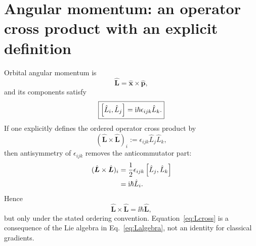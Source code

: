 \section{Angular momentum: an operator cross product with an explicit definition}

Orbital angular momentum is
\begin{equation}
\hat{\bm{L}}=\hat{\bm{x}}\times\hat{\bm{p}},
\end{equation}
and its components satisfy
\begin{equation}
\boxed{
\left[\hat L_i,\hat L_j\right]
=
\mathrm{i}\hbar\epsilon_{ijk}\hat L_k.
}
\label{eq:Lalgebra}
\end{equation}
If one explicitly defines the ordered operator cross product by
\begin{equation}
(\hat{\bm{L}}\times\hat{\bm{L}})_i
:=
\epsilon_{ijk}\hat L_j\hat L_k,
\end{equation}
then antisymmetry of \(\epsilon_{ijk}\) removes the anticommutator part:
\begin{align}
(\hat{\bm{L}}\times\hat{\bm{L}})_i
&=
\frac{1}{2}\epsilon_{ijk}\left[\hat L_j,\hat L_k\right]
\\
&=
\mathrm{i}\hbar\hat L_i.
\end{align}
Hence
\begin{equation}
\boxed{
\hat{\bm{L}}\times\hat{\bm{L}}
=
\ii\hbar\hat{\bm{L}},
}
\label{eq:Lcross}
\end{equation}
but only under the stated ordering convention. Equation~\eqref{eq:Lcross} is a consequence of the Lie algebra in Eq.~\eqref{eq:Lalgebra}, not an identity for classical gradients.
